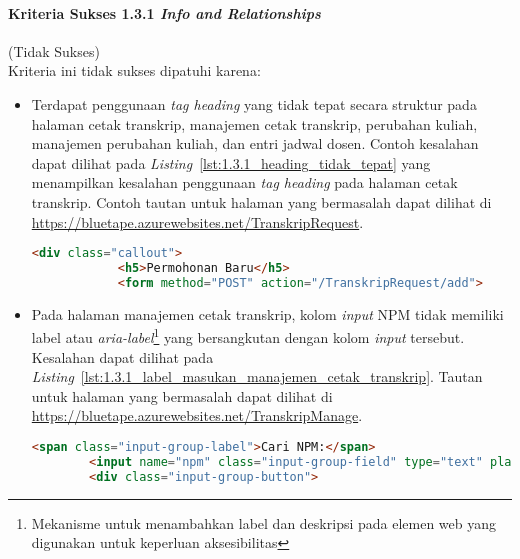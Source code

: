 \paragraph{Kriteria Sukses 1.3.1 \textit{Info and Relationships}}
\label{par:kepatuhan_bluetape_kriteria_sukses_1.3.1}
(Tidak Sukses)\\

Kriteria ini tidak sukses dipatuhi karena:
\begin{itemize}
    \item Terdapat penggunaan \textit{tag heading} yang tidak tepat secara struktur pada halaman cetak transkrip, manajemen cetak transkrip, perubahan kuliah, manajemen perubahan kuliah, dan entri jadwal dosen. Contoh kesalahan dapat dilihat pada \mbox{\textit{Listing} \ref{lst:1.3.1_heading_tidak_tepat}} yang menampilkan kesalahan penggunaan \textit{tag heading} pada halaman cetak transkrip. Contoh tautan untuk halaman yang bermasalah dapat dilihat di \url{https://bluetape.azurewebsites.net/TranskripRequest}.
    \begin{lstlisting}[frame=single, label={lst:1.3.1_heading_tidak_tepat}, language=HTML, caption=Pelanggaran Kriteria Sukses 1.3.1 pada Halaman Cetak Transkrip]
        <div class="callout">
            <h5>Permohonan Baru</h5>
            <form method="POST" action="/TranskripRequest/add">
    \end{lstlisting}

    \item Pada halaman manajemen cetak transkrip, kolom \textit{input} NPM tidak memiliki label atau \textit{aria-label}\footnote{Mekanisme untuk menambahkan label dan deskripsi pada elemen web yang digunakan untuk keperluan aksesibilitas} yang bersangkutan dengan kolom \textit{input} tersebut. Kesalahan dapat dilihat pada \mbox{\textit{Listing} \ref{lst:1.3.1_label_masukan_manajemen_cetak_transkrip}}. Tautan untuk halaman yang bermasalah dapat dilihat di \url{https://bluetape.azurewebsites.net/TranskripManage}.
    \begin{lstlisting}[frame=single, label={lst:1.3.1_label_masukan_manajemen_cetak_transkrip}, language=HTML, caption=Pelanggaran Kriteria Sukses 1.3.1 pada Halaman Manajemen Cetak Transkrip]
        <span class="input-group-label">Cari NPM:</span>
        <input name="npm" class="input-group-field" type="text" placeholder="2013730013" maxlength="10" minlength="10"/>
        <div class="input-group-button">
    \end{lstlisting}


\end{itemize}
